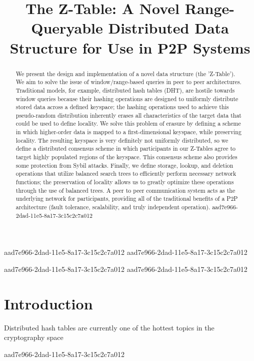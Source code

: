 \documentclass[12pt]{article}
\title{The Z-Table: A Novel Range-Queryable Distributed Data Structure for Use in P2P Systems}
\begin{document}
\maketitle
aad7e966-2dad-11e5-8a17-3c15c2c7a012
aad7e966-2dad-11e5-8a17-3c15c2c7a012\begin{abstract}
We present the design and implementation of a novel data structure (the 'Z-Table'). We aim to solve the issue of window/range-based queries in peer to peer architectures. Traditional models, for example,  distributed hash tables (DHT), are hostile towards window queries because their hashing operations are designed to uniformly distribute stored data across a defined keyspace; the hashing operations used to achieve this pseudo-random distribution inherently erases all characteristics of the target data that could be used to define locality. We solve this problem of erasure by defining a scheme in which higher-order data is mapped to a first-dimensional keyspace, while preserving locality. The resulting keyspace is very definitely not uniformly distributed, so we define a distributed consensus scheme in which participants in our Z-Tables agree to target highly populated regions of the keyspace. This consensus scheme also provides some protection from Sybil attacks. Finally, we define storage, lookup, and deletion operations that utilize balanced search trees to efficiently perform necessary network functions; the preservation of locality allows us to greatly optimize these operations through the use of balanced trees. A peer to peer communication system acts as the underlying network for participants, providing all of the traditional benefits of a P2P architecture (fault tolerance, scalability, and truly independent operation).
aad7e966-2dad-11e5-8a17-3c15c2c7a012\end{abstract}

aad7e966-2dad-11e5-8a17-3c15c2c7a012
aad7e966-2dad-11e5-8a17-3c15c2c7a012\newpage
\section{Introduction}
Distributed hash tables are currently one of the hottest topics in the cryptography space~\cite{Stoica:2001dj,Rowstron:2001ea,Ratnasamy:2001wn}

aad7e966-2dad-11e5-8a17-3c15c2c7a012\printbibliography
\end{document}
